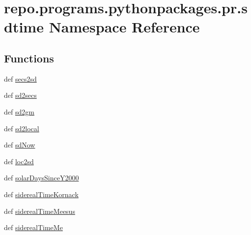 \hypertarget{namespacerepo_1_1programs_1_1pythonpackages_1_1pr_1_1sdtime}{\section{repo.\-programs.\-pythonpackages.\-pr.\-sdtime Namespace Reference}
\label{namespacerepo_1_1programs_1_1pythonpackages_1_1pr_1_1sdtime}
}
\subsection*{Functions}
\begin{DoxyCompactItemize}
\item 
def \hyperlink{namespacerepo_1_1programs_1_1pythonpackages_1_1pr_1_1sdtime_a923e8ccb4500449396bcb1ad3435f968}{secs2sd}
\item 
def \hyperlink{namespacerepo_1_1programs_1_1pythonpackages_1_1pr_1_1sdtime_adda3c804411530cc0adb21939874cffa}{sd2secs}
\item 
def \hyperlink{namespacerepo_1_1programs_1_1pythonpackages_1_1pr_1_1sdtime_a9988d76304d783450b792ae158a393e3}{sd2gm}
\item 
def \hyperlink{namespacerepo_1_1programs_1_1pythonpackages_1_1pr_1_1sdtime_a59ed699fb07f9e8b979643c5b26e3797}{sd2local}
\item 
def \hyperlink{namespacerepo_1_1programs_1_1pythonpackages_1_1pr_1_1sdtime_ace685a49213778d5d1d332877d6aba88}{sd\-Now}
\item 
def \hyperlink{namespacerepo_1_1programs_1_1pythonpackages_1_1pr_1_1sdtime_a5d2548fae8d4ed6901f999ff428401f4}{loc2sd}
\item 
def \hyperlink{namespacerepo_1_1programs_1_1pythonpackages_1_1pr_1_1sdtime_ac3c7ee3324f1c4723a245f4ddf08cd41}{solar\-Days\-Since\-Y2000}
\item 
def \hyperlink{namespacerepo_1_1programs_1_1pythonpackages_1_1pr_1_1sdtime_a5247b0c3e822a26482ae1a8d008b2ec6}{sidereal\-Time\-Kornack}
\item 
def \hyperlink{namespacerepo_1_1programs_1_1pythonpackages_1_1pr_1_1sdtime_a9c31dc1e910e733dd210a93a75cc56b6}{sidereal\-Time\-Meesus}
\item 
def \hyperlink{namespacerepo_1_1programs_1_1pythonpackages_1_1pr_1_1sdtime_ad97ec56a6ba609ebcc68f1734ec3d8d5}{sidereal\-Time\-Me}
\end{DoxyCompactItemize}
